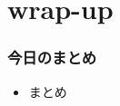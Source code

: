 \documentclass[cjk,dvipdfmx]{beamer}
\begin{document}
\section{wrap-up}
\begin{frame}
 \frametitle{今日のまとめ}
 \begin{itemize}
  \item まとめ
 \end{itemize}
\end{frame}
\end{document}
